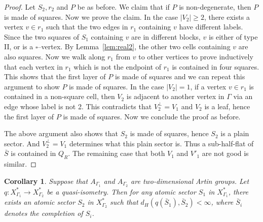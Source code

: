 \documentclass[11pt]{amsart}
\newtheorem{corollary}[theorem]{Corollary}
\theoremstyle{definition}
\newcommand{\Xa}{X^{\ast}}
\begin{document}
\begin{proof}
Let $S_2,r_2$ and $P$ be as before. We claim that if $P$ is non-degenerate, then $P$ is made of squares. Now we prove the claim. In the case $|V_2|\ge 2$, there exists a vertex $v\in r_1$ such that the two edges in $r_1$ containing $v$ have different labels. Since the two squares of $S_1$ containing $v$ are in different blocks, $v$ is either of type II, or is a $\square$--vertex. By Lemma~\ref{lem:real2}, the other two cells containing $v$ are also squares. Now we walk along $r_1$ from $v$ to other vertices to prove inductively that each vertex in $r_1$ which is not the endpoint of $r_1$ is contained in four squares. This shows that the first layer of $P$ is made of squares and we can repeat this argument to show $P$ is made of squares. In the case $|V_2|=1$, if a vertex $v\in r_1$ is contained in a non-square cell, then $V_2$ is adjacent to another vertex in $\Gamma$ via an edge whose label is not 2. This contradicts that $V^{\perp}_2=V_1$ and $V_2$ is a leaf, hence the first layer of $P$ is made of squares. Now we conclude the proof as before.

The above argument also shows that $S_2$ is made of squares, hence $S_2$ is a plain sector. And $V^{\perp}_2=V_1$ determines what this plain sector is. Thus a sub-half-flat of $\bar{S}$ is contained in $Q_R$. The remaining case that both $V_1$ and $V'_1$ are not good is similar.
\end{proof}

\begin{corollary}
	\label{cor:qi and completion}
Suppose that $A_{\Gamma_1}$ and $A_{\Gamma_2}$ are two-dimensional Artin groups. Let $q\colon \Xa_{\Gamma_1}\to \Xa_{\Gamma_2}$ be a quasi-isometry. Then for any atomic sector $S_1$ in $\Xa_{\Gamma_1}$, there exists an atomic sector $S_2$ in $\Xa_{\Gamma_2}$ such that $d_H(q(\bar S_1),\bar S_2)<\infty$, where $\bar S_i$ denotes the completion of $S_i$.
\end{corollary}
\end{document}
